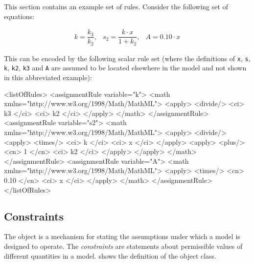This section contains an example set of rules.  Consider the
following set of equations:
\begin{linenomath}
  \begin{equation*}
    \begin{array}{lll}
      k = \dfrac{k_3}{k_2}, & s_2 = \dfrac{k \cdot x}{1 + k_2}, & A = 0.10 \cdot x
    \end{array}
  \end{equation*}
\end{linenomath}
This can be encoded by the following scalar rule set (where the
definitions of \texttt{x}, \texttt{s}, \texttt{k}, \texttt{k2},
\texttt{k3} and \texttt{A} are assumed to be located elsewhere in
the model and not shown in this abbreviated example):

\begin{example}
<listOfRules>
    <assignmentRule variable="k">
        <math xmlns="http://www.w3.org/1998/Math/MathML">
            <apply>
                <divide/>
                <ci> k3 </ci>
                <ci> k2 </ci>
            </apply>
        </math>
    </assignmentRule>
    <assignmentRule variable="s2">
        <math xmlns="http://www.w3.org/1998/Math/MathML">
            <apply>
                <divide/>
                    <apply> 
                        <times/>
                        <ci> k </ci>
                        <ci> x </ci>
                    </apply>
                    <apply> 
                        <plus/>
                        <cn> 1 </cn>
                        <ci> k2 </ci>
                    </apply>
            </apply>
        </math>
    </assignmentRule>
    <assignmentRule variable="A">
        <math xmlns="http://www.w3.org/1998/Math/MathML">
            <apply>
                <times/>
                <cn> 0.10 </cn>
                <ci> x </ci>
            </apply>
        </math>
    </assignmentRule>
</listOfRules>
\end{example}


\subsection{Constraints}
\label{sec:constraints}

The \Constraint object is a mechanism for stating the
assumptions under which a model is designed to operate.  The
\emph{constraints} are statements about permissible values of
different quantities in a model.  
shows the definition of the \Constraint object class.

